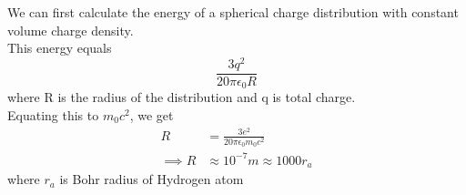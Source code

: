 \documentclass[../main.tex]{subfiles}
\begin{document}
\begin{questions}
\begin{solution}
	We can first calculate the energy of a spherical charge distribution with constant volume charge density.\\
    This energy equals \[\frac{3q^2}{20\pi\epsilon_0R}\] where R is the radius of the distribution and q is total charge.\\
    Equating this to $m_0c^2$, we get
    \begin{align}
        R &= \frac{3e^2}{20\pi\epsilon_0m_0c^2}\\
        \implies R &\approx 10^{-7}m \approx 1000r_a
    \end{align}
	where $r_a$ is Bohr radius of Hydrogen atom
\end{solution}

\end{questions}
\end{document}
